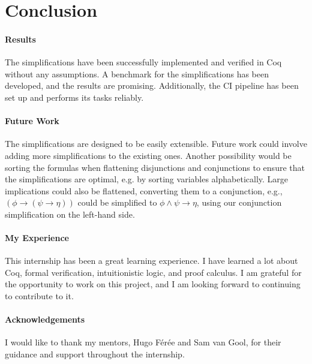 \documentclass{article}
\begin{document}
\section{Conclusion}

\paragraph{Results}
The simplifications have been successfully implemented and verified in Coq without any assumptions. A benchmark for the simplifications has been developed,
and the results are promising. Additionally, the CI pipeline has been set up and performs its tasks reliably.

\paragraph{Future Work}
The simplifications are designed to be easily extensible. Future work could involve adding more simplifications to the existing ones. Another possibility
would be sorting the formulas when flattening disjunctions and conjunctions to ensure that the simplifications are optimal, e.g. by sorting variables
alphabetically. Large implications could also be flattened, converting them to a conjunction, e.g., $(\phi \rightarrow (\psi \rightarrow \eta))$ could be
simplified to $\phi \wedge \psi \rightarrow \eta$, using our conjunction simplification on the left-hand side.

\paragraph{My Experience}
This internship has been a great learning experience. I have learned a lot about Coq, formal verification, intuitionistic logic, and proof calculus. I am
grateful for the opportunity to work on this project, and I am looking forward to continuing to contribute to it.

\paragraph{Acknowledgements}
I would like to thank my mentors, Hugo Férée and Sam van Gool, for their guidance and support throughout the internship.




\end{document}
